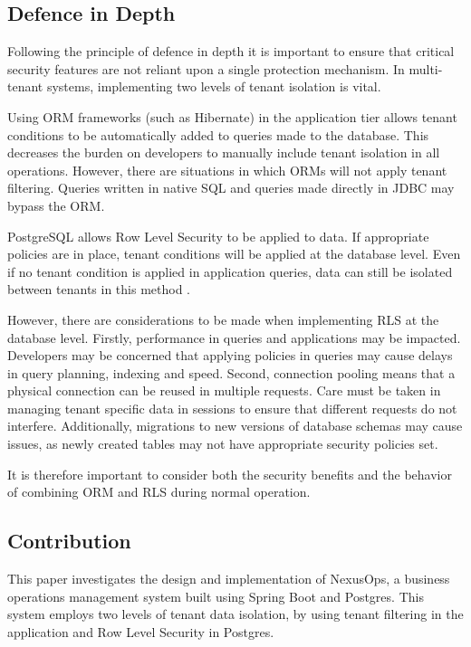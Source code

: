 \documentclass[conference]{IEEEtran}
\begin{document}
\subsection{Defence in Depth}
Following the principle of defence in depth \cite{saltzer1975} it is important to ensure that critical security features are not reliant upon a single protection mechanism. In multi-tenant systems, implementing two levels of tenant isolation is vital.

Using ORM frameworks (such as Hibernate) in the application tier allows tenant conditions to be automatically added to queries made to the database. This decreases the burden on developers to manually include tenant isolation in all operations. However, there are situations in which ORMs will not apply tenant filtering. Queries written in native SQL and queries made directly in JDBC may bypass the ORM.

PostgreSQL allows Row Level Security to be applied to data. If appropriate policies are in place, tenant conditions will be applied at the database level. Even if no tenant condition is applied in application queries, data can still be isolated between tenants in this method \cite{aws2020, postgresql17docs, postgresql17notes}.

However, there are considerations to be made when implementing RLS at the database level. Firstly, performance in queries and applications may be impacted. Developers may be concerned that applying policies in queries may cause delays in query planning, indexing and speed. Second, connection pooling means that a physical connection can be reused in multiple requests. Care must be taken in managing tenant specific data in sessions to ensure that different requests do not interfere. Additionally, migrations to new versions of database schemas may cause issues, as newly created tables may not have appropriate security policies set.

It is therefore important to consider both the security benefits and the behavior of combining ORM and RLS during normal operation.

\subsection{Contribution}
This paper investigates the design and implementation of NexusOps, a business operations management system built using Spring Boot and Postgres. This system employs two levels of tenant data isolation, by using tenant filtering in the application and Row Level Security in Postgres.
\end{document}
